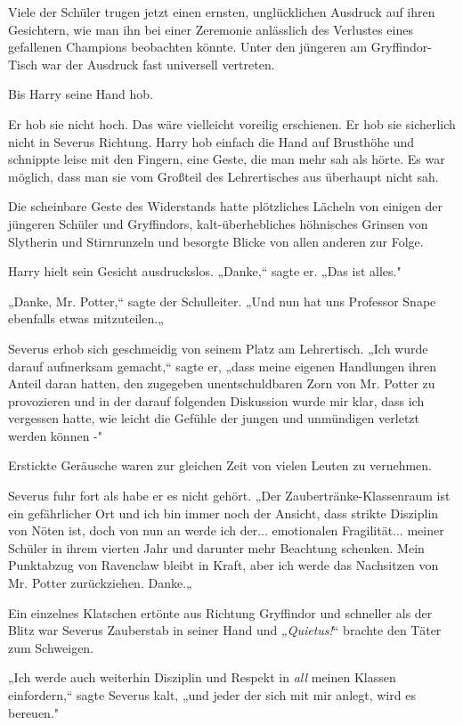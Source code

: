 {Viele der Schüler trugen jetzt einen ernsten, unglücklichen Ausdruck auf ihren Gesichtern, wie man ihn bei einer Zeremonie anlässlich des Verlustes eines gefallenen Champions beobachten könnte. Unter den jüngeren am Gryffindor-Tisch war der Ausdruck fast universell vertreten.

Bis Harry seine Hand hob.

Er hob sie nicht hoch. Das wäre vielleicht voreilig erschienen. Er hob sie sicherlich nicht in Severus Richtung. Harry hob einfach die Hand auf Brusthöhe und schnippte leise mit den Fingern, eine Geste, die man mehr sah als hörte. Es war möglich, dass man sie vom Großteil des Lehrertisches aus überhaupt nicht sah.

Die scheinbare Geste des Widerstands hatte plötzliches Lächeln von einigen der jüngeren Schüler und Gryffindors, kalt-überhebliches höhnisches Grinsen von Slytherin und Stirnrunzeln und besorgte Blicke von allen anderen zur Folge.

Harry hielt sein Gesicht ausdruckslos. „Danke,“ sagte er. „Das ist alles."

„Danke, Mr. Potter,“ sagte der Schulleiter. „Und nun hat uns Professor Snape ebenfalls etwas mitzuteilen.„

Severus erhob sich geschmeidig von seinem Platz am Lehrertisch. „Ich wurde darauf aufmerksam gemacht,“ sagte er, „dass meine eigenen Handlungen ihren Anteil daran hatten, den zugegeben unentschuldbaren Zorn von Mr. Potter zu provozieren und in der darauf folgenden Diskussion wurde mir klar, dass ich vergessen hatte, wie leicht die Gefühle der jungen und unmündigen verletzt werden können -"

Erstickte Geräusche waren zur gleichen Zeit von vielen Leuten zu vernehmen.

Severus fuhr fort als habe er es nicht gehört. „Der Zaubertränke-Klassenraum ist ein gefährlicher Ort und ich bin immer noch der Ansicht, dass strikte Disziplin von Nöten ist, doch von nun an werde ich der... emotionalen Fragilität... meiner Schüler in ihrem vierten Jahr und darunter mehr Beachtung schenken. Mein Punktabzug von Ravenclaw bleibt in Kraft, aber ich werde das Nachsitzen von Mr. Potter zurückziehen. Danke.„

Ein einzelnes Klatschen ertönte aus Richtung Gryffindor und schneller als der Blitz war Severus Zauberstab in seiner Hand und „\emph{Quietus!}“ brachte den Täter zum Schweigen.

„Ich werde auch weiterhin Disziplin und Respekt in \emph{all} meinen Klassen einfordern,“ sagte Severus kalt, „und jeder der sich mit mir anlegt, wird es bereuen."

}
